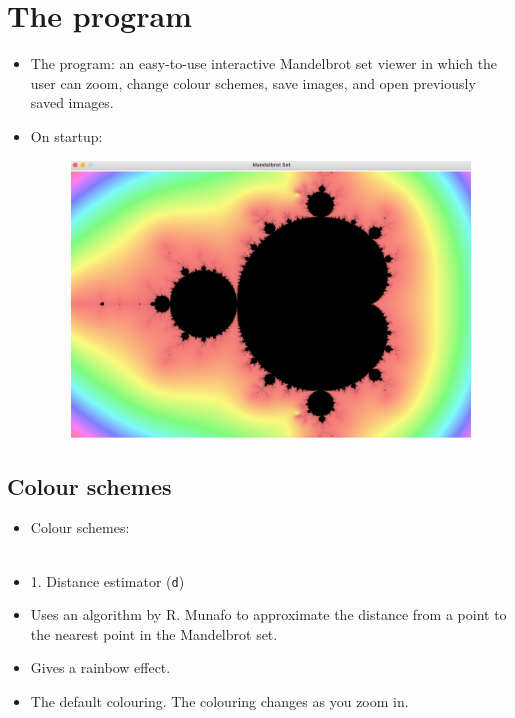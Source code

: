 \documentclass{beamer}
\begin{document}
\section{The program}
\frame 
{
\begin{itemize}
\item <1->The program: an easy-to-use interactive Mandelbrot set viewer in which the user can zoom, change colour schemes, save images, and open previously saved images.

\item <2->On startup:
\begin{figure}
\centering
\includegraphics[scale=0.2]{presentation_images/startup_set} 
\end{figure}
\end{itemize}

}
\subsection{Colour schemes}
\frame
{
\begin{itemize}
\item <1-> Colour schemes: \\\text{}\\
\item <2->1. Distance estimator (\texttt{d})
\item <3->Uses an algorithm by R. Munafo to approximate the distance from a point to the nearest point in the Mandelbrot set.
\item <4->Gives a rainbow effect.
\item <5->The default colouring. The colouring changes as you zoom in.
\end{itemize}

}
\end{document}
